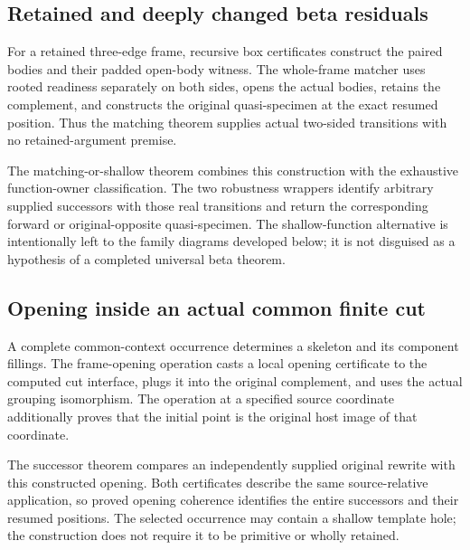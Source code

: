 \subsection{Retained and deeply changed beta residuals}
For a retained three-edge frame, recursive box certificates construct the paired bodies and their padded open-body witness. The whole-frame matcher uses rooted readiness separately on both sides, opens the actual bodies, retains the complement, and constructs the original quasi-specimen at the exact resumed position. Thus the matching theorem supplies actual two-sided transitions with no retained-argument premise.

The matching-or-shallow theorem combines this construction with the exhaustive function-owner classification. The two robustness wrappers identify arbitrary supplied successors with those real transitions and return the corresponding forward or original-opposite quasi-specimen. The shallow-function alternative is intentionally left to the family diagrams developed below; it is not disguised as a hypothesis of a completed universal beta theorem.
\par{}

\subsection{Opening inside an actual common finite cut}
A complete common-context occurrence determines a skeleton and its component fillings. The frame-opening operation casts a local opening certificate to the computed cut interface, plugs it into the original complement, and uses the actual grouping isomorphism. The operation at a specified source coordinate additionally proves that the initial point is the original host image of that coordinate.

The successor theorem compares an independently supplied original rewrite with this constructed opening. Both certificates describe the same source-relative application, so proved opening coherence identifies the entire successors and their resumed positions. The selected occurrence may contain a shallow template hole; the construction does not require it to be primitive or wholly retained.
\par{}

